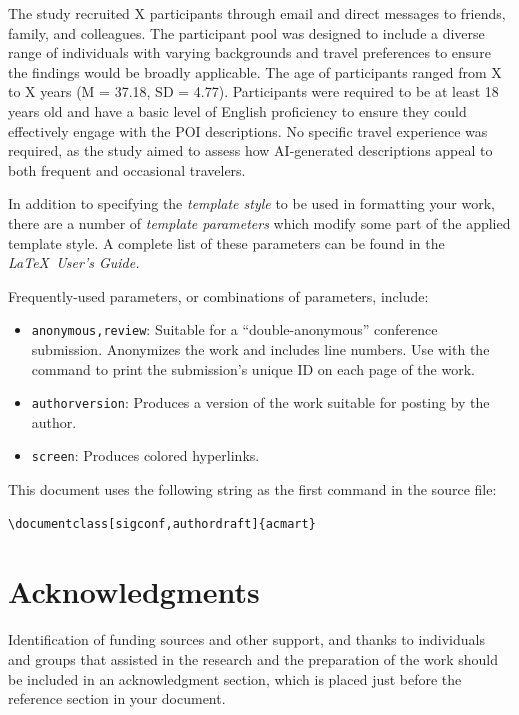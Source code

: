 \documentclass[sigconf,review,anonymous]{acmart}
\begin{document}
The study recruited X participants through email and direct messages to friends, family, and colleagues. The participant pool was designed to include a diverse range of individuals with varying backgrounds and travel preferences to ensure the findings would be broadly applicable. The age of participants ranged from X to X years (M = 37.18, SD = 4.77). Participants were required to be at least 18 years old and have a basic level of English proficiency to ensure they could effectively engage with the POI descriptions. No specific travel experience was required, as the study aimed to assess how AI-generated descriptions appeal to both frequent and occasional travelers.

In addition to specifying the {\itshape template style} to be used in
formatting your work, there are a number of {\itshape template parameters}
which modify some part of the applied template style. A complete list
of these parameters can be found in the {\itshape \LaTeX\ User's Guide.}

Frequently-used parameters, or combinations of parameters, include:
\begin{itemize}
\item {\texttt{anonymous,review}}: Suitable for a ``double-anonymous''
  conference submission. Anonymizes the work and includes line
  numbers. Use with the \texttt{\string\acmSubmissionID} command to print the
  submission's unique ID on each page of the work.
\item{\texttt{authorversion}}: Produces a version of the work suitable
  for posting by the author.
\item{\texttt{screen}}: Produces colored hyperlinks.
\end{itemize}

This document uses the following string as the first command in the
source file:
\begin{verbatim}
\documentclass[sigconf,authordraft]{acmart}
\end{verbatim}





\section{Acknowledgments}

Identification of funding sources and other support, and thanks to
individuals and groups that assisted in the research and the
preparation of the work should be included in an acknowledgment
section, which is placed just before the reference section in your
document.
\end{document}
